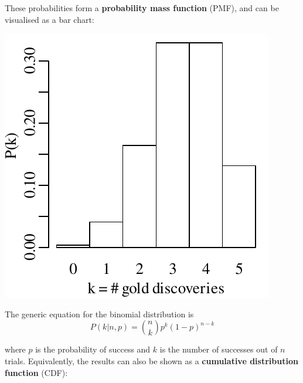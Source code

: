 These probabilities form a \textbf{probability mass function} (PMF),
and can be visualised as a bar chart:

\noindent\begin{minipage}[t][][b]{.3\textwidth}
  \includegraphics[width=\textwidth]{../figures/goldbarplot.pdf}
\end{minipage}
\begin{minipage}[t][][t]{.7\textwidth}
  \label{fig:goldbar}
\end{minipage}

The generic equation for the binomial distribution is
\begin{equation}
  P(k|n,p) = \binom{n}{k} p^k (1-p)^{n-k}
  \label{eq:binom}
\end{equation}

\noindent where $p$ is the probability of success and $k$ is the
number of successes out of $n$ trials. Equivalently, the results can
also be shown as a \textbf{cumulative distribution function} (CDF):

